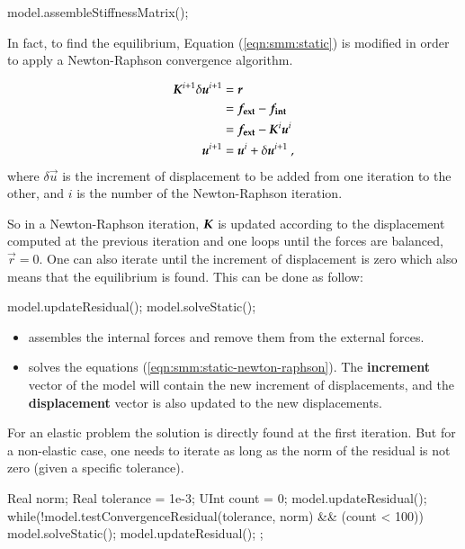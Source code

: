 \begin{cpp}
  model.assembleStiffnessMatrix();
\end{cpp}

In fact, to find the  equilibrium, Equation (\ref{eqn:smm:static}) is modified in
order to apply a Newton-Raphson convergence algorithm.

\begin{align}\label{eqn:smm:static-newton-raphson}
  \boldsymbol{K}^{i+1} \delta\boldsymbol{u}^{i+1} &= \boldsymbol{r} \\
  &= \boldsymbol{f_{{\mathrm{ext}}}} - \boldsymbol{f_{{\mathrm{int}}}}\\
  &= \boldsymbol{f_{{\mathrm{ext}}}} - \boldsymbol{K}^{i} \boldsymbol{u}^{i}\\
  \boldsymbol{u}^{i+1} &= \boldsymbol{u}^{i} + \delta\boldsymbol{u}^{i+1}~,\nonumber
\end{align}
where $\delta\vec{ u}$ is the  increment of displacement  to be added  from one
iteration to the other, and $i$ is the number of the Newton-Raphson iteration.

So  in  a  Newton-Raphson  iteration,  $\boldsymbol{K}$ is  updated  according  to  the
displacement computed at  the previous iteration and one  loops until the forces
are balanced, \ie $\vec{r} = 0$.  One can also iterate until the increment of
displacement is zero which also means that the equilibrium is found. This can be
done as follow:

\begin{cpp}
  model.updateResidual();
  model.solveStatic();
\end{cpp}
\begin{itemize}
\item {} assembles the  internal forces and remove them
  from the external forces.
\item        {}         solves        the        equations
  (\ref{eqn:smm:static-newton-raphson}).   The \textbf{increment} vector  of the
  model   will   contain  the   new   increment   of   displacements,  and   the
  \textbf{displacement} vector is also updated to the new displacements.
\end{itemize}

For  an   elastic  problem  the  solution   is  directly  found   at  the  first
iteration. But for a non-elastic case, one  needs to iterate as long as the norm
of the residual is not zero (given a specific tolerance).
\begin{cpp}
  Real norm;
  Real tolerance = 1e-3;
  UInt count = 0;
  model.updateResidual();
  while(!model.testConvergenceResidual(tolerance, norm) && (count < 100)) {
    model.solveStatic();
    model.updateResidual();
  };
\end{cpp}

